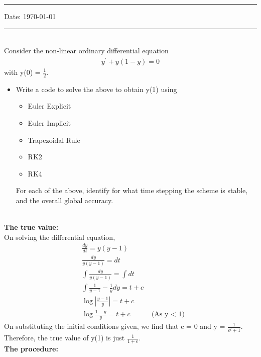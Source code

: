 \documentclass[letterpaper]{exam}
\begin{document}
\hrule
\vspace{3mm}
\noindent 
\vspace{3mm}

\noindent
{{\sf Date: \today }} %



\vspace{3mm}
\hrule
\begin{questions}
\question{\sc[Numerical O.D.E]}\\
Consider the non-linear ordinary differential equation
\begin{align*}
    y^{'} + y(1-y) = 0
\end{align*}
with y(0) = $\frac{1}{2}$.
\begin{itemize}
    \item Write a code to solve the above to obtain y(1) using
    \begin{itemize}
        \item Euler Explicit
        \item Euler Implicit
        \item Trapezoidal Rule
        \item RK2
        \item RK4
    \end{itemize}
    For each of the above, identify for what time stepping the scheme is stable, and the overall global accuracy.
\end{itemize}
\begin{solution}
\\
\textbf{The true value:}\\
On solving the differential equation,
\begin{align*}
    &\frac{dy}{dt} = y(y-1) \\
    &\frac{dy}{y(y-1)} = dt\\
    &\int \frac{dy}{y(y-1)} = \int dt\\
    &\int \frac{1}{y-1} - \frac{1}{y} dy = t + c\\
    &\log{\left|\frac{y-1}{y} \right|}= t+c\\
    &\log{\frac{1-y}{y}} = t+c &\mbox{ (As y $<$ 1)}
\end{align*}
On substituting the initial conditions given, we find that c = 0 and y = $\frac{1}{e^t + 1}$.\\
Therefore, the true value of y(1) is just $\frac{1}{1+e}$.\\
\textbf{The procedure:}\\

\end{solution}
\end{questions}
\end{document}
